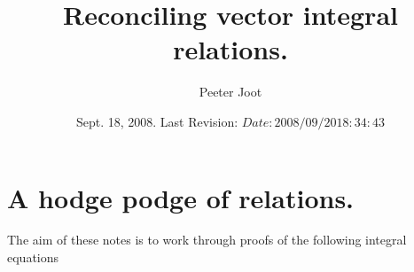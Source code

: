 \documentclass{article}
\title{ Reconciling vector integral relations. }
\author{Peeter Joot}
\date{ Sept. 18, 2008.  Last Revision: $Date: 2008/09/20 18:34:43 $ }
\begin{document}
\maketitle{}

\tableofcontents

\section{ A hodge podge of relations. }


The aim of these notes is to work through proofs of the following 
integral equations
\end{document}
